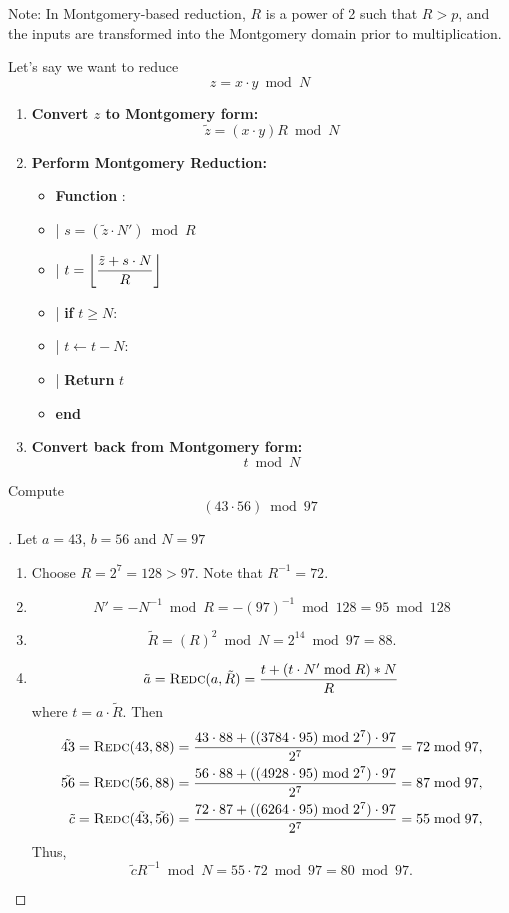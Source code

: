 Note: In Montgomery-based reduction, $R$ is a power of 2 such that $R > p$, and the inputs are transformed into the Montgomery domain prior to multiplication.
\fi

Let's say we want to reduce \[
z = x\cdot y \bmod N
\]
\begin{enumerate}
\item \textbf{Convert $z$ to Montgomery form:} \[
\tilde{z}=(x\cdot y)R\bmod N
\]
\item \textbf{Perform Montgomery Reduction:}
\begin{itemize}
	\item[] \textbf{Function} :
	\item[] | \hspace{16pt} $s=(\tilde{z}\cdot N')\bmod R$
	\item[] | \hspace{16pt} $\displaystyle t=\floor*{\frac{\tilde{z} + s\cdot N}{R}}$
	\item[] | \hspace{16pt} \textbf{if} $t\geq N$:
	\item[] | \hspace{32pt} $t\gets t-N$:
	\item[] | \hspace{16pt} \textbf{Return} $t$
	\item[] \textbf{end}
\end{itemize}
\item \textbf{Convert back from Montgomery form:} \[
t\bmod N
\]
\end{enumerate}

\begin{example}
Compute \[
(43\cdot 56)\bmod 97
\]
\begin{proof}[\sol]
Let $a=43$, $b=56$ and $N=97$ \begin{enumerate}[\bf 1.]
	\item Choose $R=2^7=128>97.$ Note that $R^{-1}=72$.
	\item \[
	N'=-N^{-1}\bmod R=-(97)^{-1}\bmod 128=95\bmod 128
	\]
	\item \[
	\tilde{R}=(R)^2\bmod N=2^{14}\bmod 97=88.
	\]
	\item \[
	\tilde{a} = \Call{Redc}{a, \tilde{R}}=\frac{t+(t\cdot N'\bmod R)*N}{R}
	\] where $t=a\cdot\tilde{R}$.
	Then \begin{align*}
		\tilde{43}&=\Call{Redc}{43, 88}=\frac{43\cdot 88+((3784\cdot95)\bmod 2^7)\cdot 97}{2^7}=72\bmod 97,\\
		\tilde{56}&=\Call{Redc}{56, 88}=\frac{56\cdot 88+((4928\cdot95)\bmod 2^7)\cdot 97}{2^7}=87\bmod 97,\\
		\tilde{c}&=\Call{Redc}{\tilde{43}, \tilde{56}}=\frac{72\cdot 87+((6264\cdot95)\bmod 2^7)\cdot 97}{2^7}=55\bmod 97,
	\end{align*} Thus, \[
	\tilde{c}R^{-1}\bmod N= 55\cdot 72\bmod 97 = 80\bmod 97.
	\]
\end{enumerate}
\end{proof}
\end{example}

